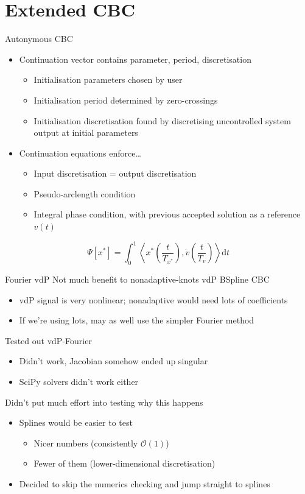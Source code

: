\documentclass[presentation]{beamer}
\begin{document}
\section{Extended CBC}
\label{sec:orgdc996a6}
\begin{frame}[label={sec:org5a2a3c0}]{Autonymous CBC}
\begin{itemize}
\item Continuation vector contains parameter, period, discretisation
\begin{itemize}
\item Initialisation parameters chosen by user
\item Initialisation period determined by zero-crossings
\item Initialisation discretisation found by discretising uncontrolled system output at initial parameters
\end{itemize}
\end{itemize}
\vfill
\begin{itemize}
\item Continuation equations enforce\ldots{}
\begin{itemize}
\item Input discretisation = output discretisation
\item Pseudo-arclength condition
\item Integral phase condition, with previous accepted solution as a reference \(v(t)\)
\end{itemize}
\end{itemize}
\vfill
\[\Psi[x^*] = \int_0^1 \left\langle x^*\left(\frac{t}{T_{x^*}}\right),  \dot{v}\left(\frac{t}{T_v}\right) \right\rangle \mathrm{d}t\]
\end{frame}

\begin{frame}[label={sec:orgd24e781}]{Fourier vdP}
Not much benefit to nonadaptive-knots vdP BSpline CBC
\begin{itemize}
\item vdP signal is very nonlinear; nonadaptive would need lots of coefficients
\item If we're using lots, may as well use the simpler Fourier method
\end{itemize}
\vfill
Tested out vdP-Fourier
\begin{itemize}
\item Didn't work, Jacobian somehow ended up singular
\item SciPy solvers didn't work either
\end{itemize}
\vfill
Didn't put much effort into testing why this happens
\begin{itemize}
\item Splines would be easier to test
\begin{itemize}
\item Nicer numbers (consistently \(\mathcal{O}(1)\))
\item Fewer of them (lower-dimensional discretisation)
\end{itemize}
\item Decided to skip the numerics checking and jump straight to splines
\end{itemize}
\end{frame}
\end{document}

